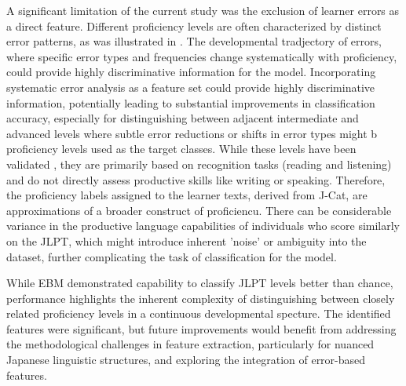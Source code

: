 A significant limitation of the current study was the exclusion of learner errors as a direct feature. Different
proficiency levels are often
characterized by distinct error patterns, as was illustrated in \citet{Hawkins_Buttery_2010}.  The
developmental tradjectory of errors, where specific error types and frequencies change systematically with
proficiency, could provide highly discriminative information for the model.
Incorporating
systematic error analysis as a
feature
set
could provide
highly discriminative information, potentially leading to substantial improvements in classification accuracy,
especially for distinguishing between adjacent intermediate and advanced levels where subtle error reductions or
shifts in error types might b proficiency levels used as the target classes. While these levels have been validated \citet{jcat_interpretation_guide}, they are primarily based on recognition tasks (reading and listening) and do not directly assess productive skills like writing or speaking. Therefore, the proficiency labels assigned to the learner texts, derived from J-Cat, are approximations of a broader construct of proficiencu. There can be considerable variance in the productive language capabilities of individuals who score similarly on the JLPT, which might introduce inherent 'noise' or ambiguity into the dataset, further complicating the task of classification for the model.

While EBM demonstrated capability to classify JLPT levels better than chance, performance highlights the inherent
complexity of distinguishing between closely related proficiency levels in a continuous developmental specture. The
identified features were significant, but future improvements would benefit from addressing the methodological
challenges in feature extraction, particularly for nuanced Japanese linguistic structures, and exploring the
integration of error-based features.